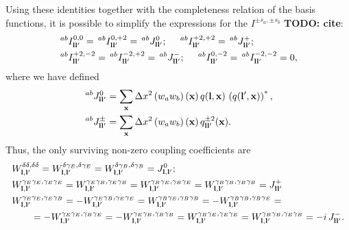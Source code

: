 \documentclass[a4paper,11pt]{article}
\newcommand{\todo}[1]{{\bf TODO: #1}}
\newcommand{\summ}[1]{\sum_{\bf #1}\Delta #1^2}
\begin{document}
    Using these identities together with the completeness relation of the basis functions, it is possible to simplify the expressions for the $I^{\pm s_a,\pm s_b}$ \todo{cite}:
    \begin{align}
      &\,^{ab}I^{0,0}_{{\bf l}{\bf l}'}=\,^{ab}I^{0,+2}_{{\bf l}{\bf l}'}=\,^{ab}J^0_{{\bf l}{\bf l}'}; \hspace{12pt}
      \,^{ab}I^{+2,+2}_{{\bf l}{\bf l}'}=\,^{ab}J^+_{{\bf l}{\bf l}'};\\
      &\,^{ab}I^{+2,-2}_{{\bf l}{\bf l}'}=\,^{ab}I^{-2,+2}_{{\bf l}{\bf l}'}=\,^{ab}J^-_{{\bf l}{\bf l}'}; \hspace{12pt}
      \,^{ab}I^{0,-2}_{{\bf l}{\bf l}'}=\,^{ab}I^{-2,-2}_{{\bf l}{\bf l}'}=0,
    \end{align}
    where  we have defined
    \begin{align}
      &\,^{ab}J^0_{{\bf l}{\bf l}'}=\summ{x}\left(w_a w_b\right)({\bf x})\,q({\bf l},{\bf x})\,\left(q({\bf l}',{\bf x})\right)^*,\\
      &\,^{ab}J^\pm_{{\bf l}{\bf l}'}=\summ{x}\left(w_a w_b\right)({\bf x})\,q^{\pm2}_{{\bf l}{\bf l}'}({\bf x}).\\
    \end{align}
    Thus, the only surviving non-zero coupling coefficients are
    \begin{align}
      &W^{\delta\delta,\delta\delta}_{{\bf l},{\bf l}'}=W^{\delta\gamma_E,\delta\gamma_E}_{{\bf l},{\bf l}'}=W^{\delta\gamma_B,\delta\gamma_B}_{{\bf l},{\bf l}'}=J^0_{{\bf l},{\bf l}'};\\
      &W^{\gamma_E\gamma_E,\gamma_E\gamma_E}_{{\bf l},{\bf l}'}=W^{\gamma_E\gamma_B,\gamma_E\gamma_B}_{{\bf l},{\bf l}'}=W^{\gamma_B\gamma_E,\gamma_B\gamma_E}_{{\bf l},{\bf l}'}=W^{\gamma_B\gamma_B,\gamma_B\gamma_B}_{{\bf l},{\bf l}'}=J^+_{{\bf l}{\bf l}'}\\\nonumber
      &W^{\gamma_E\gamma_E,\gamma_E\gamma_B}_{{\bf l},{\bf l}'}=-W^{\gamma_E\gamma_B,\gamma_E\gamma_E}_{{\bf l},{\bf l}'}=W^{\gamma_B\gamma_E,\gamma_B\gamma_B}_{{\bf l},{\bf l}'}=-W^{\gamma_B\gamma_B,\gamma_B\gamma_E}_{{\bf l},{\bf l}'}=\\
      &\hspace{20pt}=-W^{\gamma_E\gamma_E,\gamma_B\gamma_E}_{{\bf l},{\bf l}'}=-W^{\gamma_E\gamma_B,\gamma_B\gamma_B}_{{\bf l},{\bf l}'}=W^{\gamma_B\gamma_E,\gamma_E\gamma_E}_{{\bf l},{\bf l}'}=W^{\gamma_B\gamma_B,\gamma_E\gamma_B}_{{\bf l},{\bf l}'}=-i\,J^-_{{\bf l}{\bf l}'}.
    \end{align}
\end{document}
